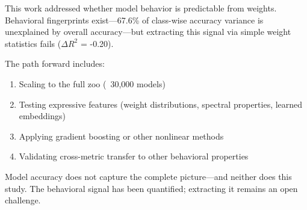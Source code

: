 
This work addressed whether model behavior is predictable from weights. Behavioral fingerprints exist---67.6\% of class-wise accuracy variance is unexplained by overall accuracy---but extracting this signal via simple weight statistics fails ($\Delta R^2$ = -0.20).

The path forward includes:
\begin{enumerate}
\item Scaling to the full zoo (~30,000 models)
\item Testing expressive features (weight distributions, spectral properties, learned embeddings)
\item Applying gradient boosting or other nonlinear methods
\item Validating cross-metric transfer to other behavioral properties
\end{enumerate}

Model accuracy does not capture the complete picture---and neither does this study. The behavioral signal has been quantified; extracting it remains an open challenge.
